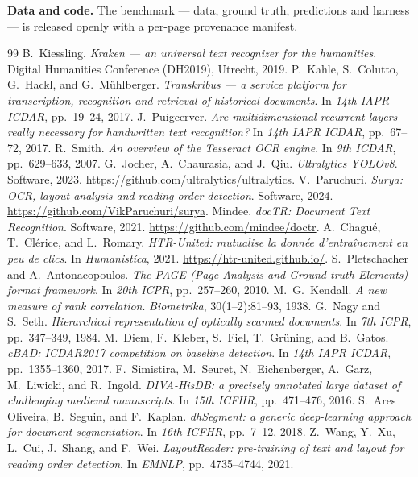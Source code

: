 \documentclass[11pt]{article}
\begin{document}
\vspace{0.5em}
\small
\textbf{Data and code.} The benchmark --- data, ground truth, predictions and
harness --- is released openly with a per-page provenance manifest.

\begin{thebibliography}{99}
\small
{} B.~Kiessling. \emph{Kraken --- an universal text recognizer for
the humanities}. Digital Humanities Conference (DH2019), Utrecht, 2019.
 P.~Kahle, S.~Colutto, G.~Hackl, and G.~M\"uhlberger.
\emph{Transkribus --- a service platform for transcription, recognition and
retrieval of historical documents}. In \emph{14th IAPR ICDAR}, pp.~19--24, 2017.
 J.~Puigcerver. \emph{Are multidimensional recurrent layers really
necessary for handwritten text recognition?} In \emph{14th IAPR ICDAR},
pp.~67--72, 2017.
 R.~Smith. \emph{An overview of the Tesseract OCR engine}. In
\emph{9th ICDAR}, pp.~629--633, 2007.
 G.~Jocher, A.~Chaurasia, and J.~Qiu. \emph{Ultralytics YOLOv8}.
Software, 2023. \url{https://github.com/ultralytics/ultralytics}.
 V.~Paruchuri. \emph{Surya: OCR, layout analysis and reading-order
detection}. Software, 2024. \url{https://github.com/VikParuchuri/surya}.
 Mindee. \emph{docTR: Document Text Recognition}. Software, 2021.
\url{https://github.com/mindee/doctr}.
 A.~Chagu\'e, T.~Cl\'erice, and L.~Romary. \emph{HTR-United:
mutualise la donn\'ee d'entra\^inement en peu de clics}. In \emph{Humanist\'ica},
2021. \url{https://htr-united.github.io/}.
 S.~Pletschacher and A.~Antonacopoulos. \emph{The PAGE (Page
Analysis and Ground-truth Elements) format framework}. In \emph{20th ICPR},
pp.~257--260, 2010.
 M.~G.~Kendall. \emph{A new measure of rank correlation}.
\emph{Biometrika}, 30(1--2):81--93, 1938.
 G.~Nagy and S.~Seth. \emph{Hierarchical representation of optically
scanned documents}. In \emph{7th ICPR}, pp.~347--349, 1984.
 M.~Diem, F.~Kleber, S.~Fiel, T.~Gr\"uning, and B.~Gatos.
\emph{cBAD: ICDAR2017 competition on baseline detection}. In \emph{14th IAPR
ICDAR}, pp.~1355--1360, 2017.
 F.~Simistira, M.~Seuret, N.~Eichenberger, A.~Garz,
M.~Liwicki, and R.~Ingold. \emph{DIVA-HisDB: a precisely annotated large dataset
of challenging medieval manuscripts}. In \emph{15th ICFHR}, pp.~471--476, 2016.
 S.~Ares Oliveira, B.~Seguin, and F.~Kaplan. \emph{dhSegment: a
generic deep-learning approach for document segmentation}. In \emph{16th ICFHR},
pp.~7--12, 2018.
 Z.~Wang, Y.~Xu, L.~Cui, J.~Shang, and F.~Wei.
\emph{LayoutReader: pre-training of text and layout for reading order detection}.
In \emph{EMNLP}, pp.~4735--4744, 2021.
\end{thebibliography}
\end{document}

